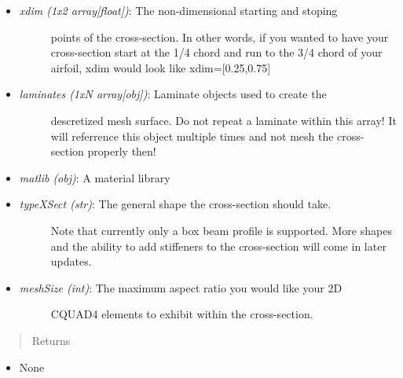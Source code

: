 \documentclass[letterpaper,10pt,english]{sphinxmanual}
\begin{document}
\begin{fulllineitems}
\begin{fulllineitems}
\begin{itemize}
\begin{description}
\end{description}

\item {} \begin{description}
\item[{\emph{xdim (1x2 array{[}float{]})}: The non-dimensional starting and stoping}] \leavevmode
points of the cross-section. In other words, if you wanted to
have your cross-section start at the 1/4 chord and run to the
3/4 chord of your airfoil, xdim would look like xdim={[}0.25,0.75{]}

\end{description}

\item {} \begin{description}
\item[{\emph{laminates (1xN array{[}obj{]})}: Laminate objects used to create the}] \leavevmode
descretized mesh surface. Do not repeat a laminate within this
array! It will referrence this object multiple times and not
mesh the cross-section properly then!

\end{description}

\item {} 
\emph{matlib (obj)}: A material library

\item {} \begin{description}
\item[{\emph{typeXSect (str)}: The general shape the cross-section should take.}] \leavevmode
Note that currently only a box beam profile is supported.
More shapes and the ability to add stiffeners to the
cross-section will come in later updates.

\end{description}

\item {} \begin{description}
\item[{\emph{meshSize (int)}: The maximum aspect ratio you would like your 2D}] \leavevmode
CQUAD4 elements to exhibit within the cross-section.

\end{description}

\end{itemize}
\begin{quote}\begin{description}
\item[{Returns}] \leavevmode
\end{description}\end{quote}
\begin{itemize}
\item {} 
None


\end{itemize}
\end{fulllineitems}
\end{fulllineitems}
\end{document}
